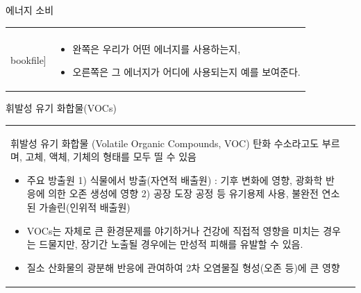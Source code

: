 \begin{frame}[t]{에너지 소비}
	\begin{tabular}{ll}
		\begin{minipage}[t]{0.65\textwidth}\scriptsize
			\begin{figure}[t]
				\texttt{[image: \\bookfile]}
			\end{figure}
		\end{minipage}	
		&
		\begin{minipage}[t]{0.3\textwidth} \scriptsize	
			\begin{itemize}
				\item 완쪽은 우리가 어떤 에너지를 사용하는지, 				
				\item 오른쪽은 그 에너지가 어디에 사용되는지 예를 보여준다.
				
			\end{itemize}

		\end{minipage}
	\end{tabular}
\end{frame}


\begin{frame}[t]{휘발성 유기 화합물(VOCs)}
	\begin{tabular}{ll}
		\begin{minipage}[t]{0.475\textwidth}\scriptsize
			휘발성 유기 화합물 (Volatile Organic Compounds, VOC) 탄화 수소라고도 부르며, 고체, 액체, 기체의 형태를 모두 띨 수 있음
			\begin{itemize}
				\item 주요 방출원
				 	1) 식물에서 방출(자연적 배출원) : 기후 변화에 영향, 광화학 반응에 의한 오존 생성에 영향 
					2) 공장 도장 공정 등 유기용제 사용, 불완전 연소된 가솔린(인위적 배출원)
				\item VOCs는 자체로 큰 환경문제를 야기하거나 건강에 직접적 영향을 미치는 경우는 드물지만, 장기간 노출될 경우에는 만성적 피해를 유발할 수 있음.
				\item 질소 산화물의 광분해 반응에 관여하여 2차 오염물질 형성(오존 등)에 큰 영향
					
			\end{itemize}
		\end{minipage}	
		&
		\begin{minipage}[t]{0.475\textwidth} \scriptsize	
			

		\end{minipage}
	\end{tabular}
\end{frame}




